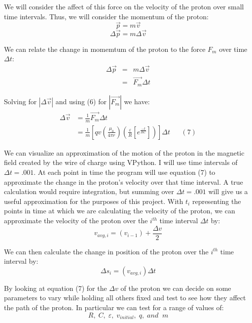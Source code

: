 \documentclass[11pt]{article}
\begin{document}
\newpage

\noindent We will consider the affect of this force on the velocity of the proton over small time intervals. Thus, we will consider the momentum of the proton:
\[
\vec{p}=m\vec{v}
\] 
\[
\Delta\vec{p}=m\Delta\vec{v}
\]

\vspace{.2in}

\noindent We can relate the change in momemtum of the proton to the force $F_m$ over time $\Delta t$:
\begin{eqnarray*}
\Delta\vec{p}&=&m\Delta\vec{v}\\&=&\vec{F_m}\Delta t
\end{eqnarray*}

\vspace{.2in}

\noindent Solving for $\left|\Delta\vec{v}\right|$ and using (6) for $\left|\vec{F_m}\right|$ we have:
\begin{align*}
\Delta\vec{v}&=\frac{1}{m}\vec{F_m}\Delta t\\&=\frac{1}{m}\left[qv\left(\frac{\mu_0}{4\pi r}\right)\left(\frac{\varepsilon}{R}\left[e^{\frac{-t}{RC}}\right]\right)\right]\Delta t &&(7)
\end{align*} 

\vspace{.2in}

\noindent We can visualize an approximation of the motion of the proton in the magnetic field created by the wire of charge using VPython. I will use time intervals of $\Delta t=.001$. At each point in time the program will use equation (7) to approximate the change in the proton's velocity over that time interval. A true calculation would require integration, but summing over $\Delta t=.001$ will give us a useful approximation for the purposes of this project. With $t_i$ representing the points in time at which we are calculating the velocity of the proton, we can approximate the velocity of the proton over the $i^{th}$ time interval $\Delta t$ by:
\[
v_{avg,i}=\left(v_{i-1}\right)+\frac{\Delta v}{2}
\]

\vspace{.2in}

\noindent We can then calculate the change in position of the proton over the $i^{th}$ time interval by:
\[
\Delta s_i=\left(v_{avg,i}\right)\Delta t
\]

\vspace{.2in}

\noindent By looking at equation (7) for the $\Delta v$ of the proton we can decide on some parameters to vary while holding all others fixed and test to see how they affect the path of the proton. In particular we can test for a range of values of:
\[
R,\;C,\;\varepsilon,\;v_{initial},\;q,\;and\;\;m
\]
\end{document}
